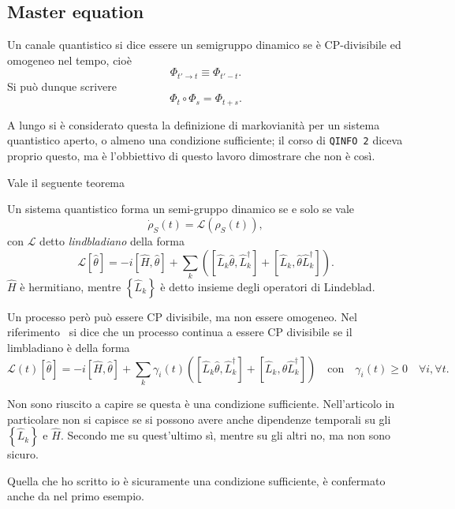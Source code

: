 \documentclass[a4]{article}
\begin{document}
\subsection{Master equation}
\begin{defn}
	Un canale quantistico si dice essere un semigruppo dinamico se è CP-divisibile
	ed omogeneo nel tempo, cioè
	\[\Phi_{t'\to t} \equiv \Phi_{t'- t}.\]
	Si può dunque scrivere
	\[\Phi_{t} \circ \Phi_{s} = \Phi_{t+s}.\]
\end{defn}
A lungo si è considerato questa la definizione di markovianità per un sistema quantistico
aperto, o almeno una condizione sufficiente; il corso di \texttt{QINFO 2} diceva proprio questo, ma è l'obbiettivo di questo lavoro dimostrare che non è così.

Vale il seguente teorema
\begin{thm} \label{thm:GKSL}
	Un sistema quantistico forma un semi-gruppo dinamico se e solo se vale
	\[\dot{\rho}_S(t)=\mathcal{L}\left(\rho_S(t)\right),\]
	con \(\mathcal{L}\) detto \emph{lindbladiano} della forma
	\[\mathcal{L}\left[\hat{\theta}\right] 
	  = -i\left[\hat{H},\hat{\theta}\right]+
	    \sum_k \left(\left[\hat{L}_k\hat{\theta},\hat{L}^\dag_k\right]+
	                 \left[\hat{L}_k,\hat{\theta}\hat{L}^\dag_k\right] \right).\]
	\(\hat{H}\) è hermitiano, mentre \(\left\{\hat{L}_k\right\}\) è detto insieme
	degli operatori di Lindeblad.
\end{thm}
Un processo però può essere CP divisibile, ma non essere omogeneo.
Nel riferimento~\cite{breuer2016colloquium} si dice che un processo continua a essere
CP divisibile se il limbladiano è della forma
\[\mathcal{L}(t)\left[\hat{\theta}\right] 
= -i\left[\hat{H},\hat{\theta}\right]+
\sum_k \gamma_i(t) \left(\left[\hat{L}_k\hat{\theta},\hat{L}^\dag_k\right]+
\left[\hat{L}_k,\hat{\theta}\hat{L}^\dag_k\right] \right)
\quad \text{con} \quad \gamma_i(t) \ge 0 \quad \forall i, \forall t.\]
\begin{tcolorbox}[colback=yellow!5!white,colframe=yellow!85!black,title=Nota]
	Non sono riuscito a capire se questa è una condizione sufficiente. Nell'articolo
	\cite{breuer2016colloquium} in particolare non si capisce se si possono avere anche
	dipendenze temporali su gli \(\left\{\hat{L}_k\right\}\) e \(\hat{H}\). Secondo me
	su quest'ultimo sì, mentre su gli altri no, ma non sono sicuro.
	
	Quella che ho scritto io è sicuramente una condizione sufficiente, è confermato anche
	da \cite{budini2018quantum} nel primo esempio.
\end{tcolorbox}
\end{document}
